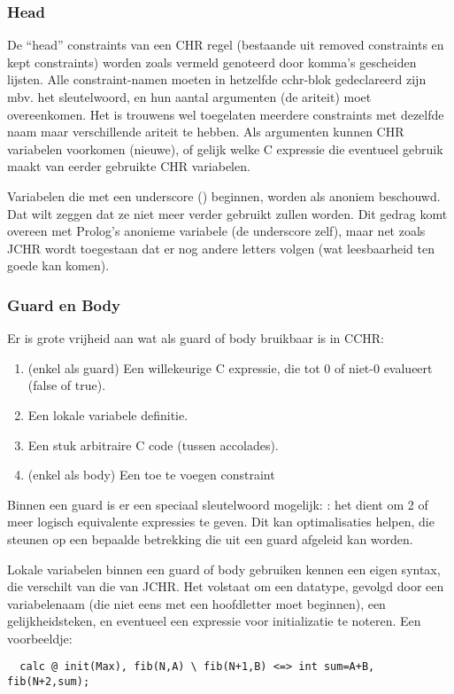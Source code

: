 \subsubsection{Head}

De ``head'' constraints van een CHR regel (bestaande uit removed constraints en kept constraints) worden zoals vermeld genoteerd door komma's gescheiden lijsten. Alle constraint-namen moeten in hetzelfde cchr-blok gedeclareerd zijn mbv. het  sleutelwoord, en hun aantal argumenten (de ariteit) moet overeenkomen. Het is trouwens wel toegelaten meerdere constraints met dezelfde naam maar verschillende ariteit te hebben. Als argumenten kunnen CHR variabelen voorkomen (nieuwe), of gelijk welke C expressie die eventueel gebruik maakt van eerder gebruikte CHR variabelen. 

Variabelen die met een underscore (\code{\_}) beginnen, worden als anoniem beschouwd. Dat wilt zeggen dat ze niet meer verder gebruikt zullen worden. Dit gedrag komt overeen met Prolog's anonieme variabele (de underscore zelf), maar net zoals JCHR wordt toegestaan dat er nog andere letters volgen (wat leesbaarheid ten goede kan komen).

\subsubsection{Guard en Body}

Er is grote vrijheid aan wat als guard of body bruikbaar is in CCHR: \begin{enumerate}
  \item (enkel als guard) Een willekeurige C expressie, die tot 0 of niet-0 evalueert (false of true).
  \item Een lokale variabele definitie.
  \item Een stuk arbitraire C code (tussen accolades).
  \item (enkel als body) Een toe te voegen constraint
\end{enumerate}

Binnen een guard is er een speciaal sleutelwoord mogelijk: : het dient om 2 of meer logisch equivalente expressies te geven. Dit kan optimalisaties helpen, die steunen op een bepaalde betrekking die uit een guard afgeleid kan worden.

Lokale variabelen binnen een guard of body gebruiken kennen een eigen syntax, die verschilt van die van JCHR. Het volstaat om een datatype, gevolgd door een variabelenaam (die niet eens met een hoofdletter moet beginnen), een gelijkheidsteken, en eventueel een expressie voor initializatie te noteren. Een voorbeeldje: \begin{Verbatim}
  calc @ init(Max), fib(N,A) \ fib(N+1,B) <=> int sum=A+B, fib(N+2,sum);
\end{Verbatim}

